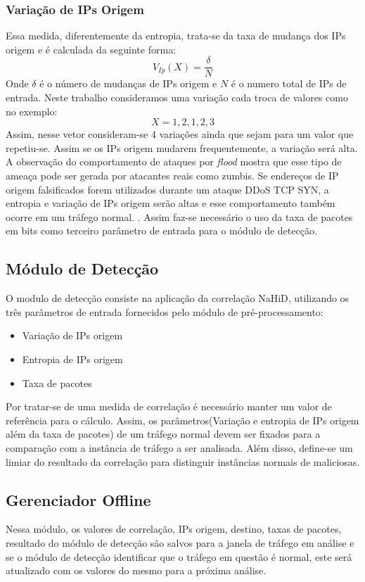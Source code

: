 \subsubsection{Variação de IPs Origem}
Essa medida, diferentemente da entropia, trata-se da taxa de mudança dos IPs origem e é calculada da seguinte forma:
\begin{equation}
	V_{Ip}(X) = \frac{\delta}{N}
\end{equation}
Onde $\delta$ é o número de mudanças de IPs origem e $N$ é o numero total de IPs de entrada. Neste trabalho consideramos uma variação cada troca de valores como no exemplo:
\begin{equation}
	X = {1,2,1,2,3}
\end{equation}
Assim, nesse vetor consideram-se 4 variações ainda que sejam para um valor que repetiu-se. Assim se os IPs origem mudarem frequentemente, a variação será alta. \cite{HOQUE201748}
\\
A observação do comportamento de ataques por \textit{flood} mostra que esse tipo de ameaça pode ser gerada por atacantes reais como zumbis. Se endereços de IP origem falsificados forem utilizados durante um ataque DDoS TCP SYN, a entropia e variação de IPs origem serão altas e esse comportamento também ocorre em um tráfego normal. \cite{HOQUE201748}. Assim faz-se necessário o uso da taxa de pacotes em bits como terceiro parâmetro de entrada para o módulo de detecção.

\subsection{Módulo de Detecção}
O modulo de detecção consiste na aplicação da correlação NaHiD, utilizando os três parâmetros de entrada fornecidos pelo módulo de pré-processamento:
\begin{itemize}
	\item Variação de IPs origem
	\item Entropia de IPs origem
	\item Taxa de pacotes
\end{itemize}
Por tratar-se de uma medida de correlação é necessário manter um valor de referência para o cálculo. Assim, os parâmetros(Variação e entropia de IPs origem além da taxa de pacotes) de um tráfego normal devem ser fixados para a comparação com a instância de tráfego a ser analisada. Além disso, define-se um limiar do resultado da correlação para distinguir instâncias normais de maliciosas. 
\subsection{Gerenciador Offline}
Nessa módulo, os valores de correlação, IPs origem, destino, taxas de pacotes, resultado do módulo de detecção são salvos para a janela de tráfego em análise e se o módulo de detecção identificar que o tráfego em questão é normal, este será atualizado com os valores do mesmo para a próxima análise.


